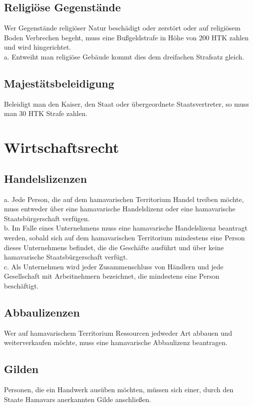 \documentclass{article}
\begin{document}
\subsection{Religiöse Gegenstände}
Wer Gegenstände religiöser Natur beschädigt oder zerstört oder auf religiösem Boden Verbrechen begeht, muss eine Bußgeldstrafe in Höhe von 200 HTK zahlen und wird hingerichtet.\\
a. Entweiht man religiöse Gebäude kommt dies dem dreifachen Strafsatz gleich.

\subsection{Majestätsbeleidigung}
Beleidigt man den Kaiser, den Staat oder übergeordnete Staatsvertreter, so muss man 30 HTK Strafe zahlen.

\section{Wirtschaftsrecht}
\subsection{Handelslizenzen}\label{lizenzen}
a. Jede Person, die auf dem hamavarischen Territorium Handel treiben möchte, muss entweder über eine hamavarische Handelslizenz oder eine hamavarische Staatsbürgerschaft verfügen.\\
b. Im Falle eines Unternehmens muss eine hamavarische Handelslizenz beantragt werden, sobald sich auf dem hamavarischen Territorium mindestens eine Person dieses Unternehmens befindet, die die Geschäfte ausführt und über keine hamavarische Staatsbürgerschaft verfügt.\\
c. Als Unternehmen wird jeder Zusammenschluss von Händlern und jede Gesellschaft mit Arbeitnehmern bezeichnet, die mindestens eine Person beschäftigt.

\subsection{Abbaulizenzen}
Wer auf hamavarischem Territorium Ressourcen jedweder Art abbauen und weiterverkaufen möchte, muss eine hamavarische Abbaulizenz beantragen.

\subsection{Gilden}\label{gilden}
Personen, die ein Handwerk ausüben möchten, müssen sich einer, durch den Staate Hamavars anerkannten Gilde anschließen.
\end{document}
